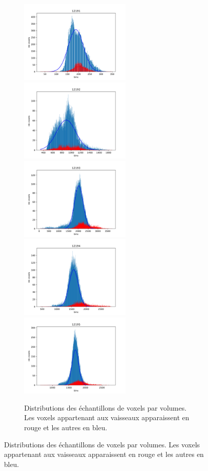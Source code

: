 \begin{figure}[!ht]
  \centering
  \begin{subfigure}{\textwidth}
    \centering
    \includegraphics[height=4cm]{Images/gen_12191.pdf}
    \includegraphics[height=4cm]{Images/gen_12192.pdf}
    \includegraphics[height=4cm]{Images/gen_12193.pdf}
    \includegraphics[height=4cm]{Images/gen_12194.pdf}
    \includegraphics[height=4cm]{Images/gen_12195.pdf}

    \caption{Distributions des échantillons de voxels par volumes. Les voxels appartenant aux vaisseaux apparaissent en rouge et les autres en bleu.}
  \end{subfigure}


\end{figure}
